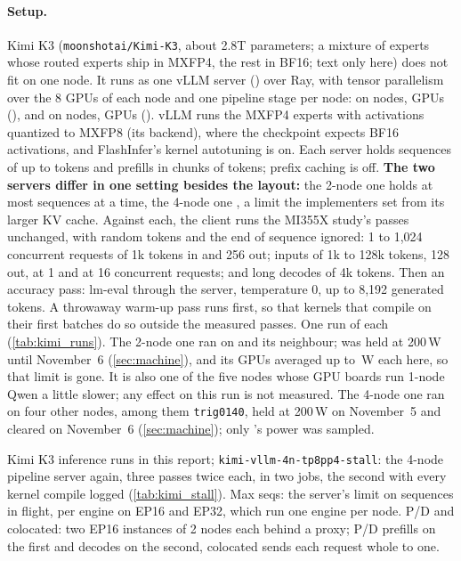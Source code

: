 \paragraph{Setup.} Kimi K3 (\texttt{moonshotai/Kimi-K3}, about 2.8T parameters; a mixture of experts whose routed experts ship in MXFP4, the rest in BF16; text only here) does not fit on one node. It runs as one vLLM server (\TriKimiVllm) over Ray, with tensor parallelism over the 8 GPUs of each node and one pipeline stage per node: on \TriKimiNodes{} nodes, \TriKimiGpus{} GPUs (\TriKimiLayout), and on \TriKimiFourNodes{} nodes, \TriKimiFourGpus{} GPUs (\TriKimiFourLayout). vLLM runs the MXFP4 experts with activations quantized to MXFP8 (its \texttt{\TriKimiMoeBackend} backend), where the checkpoint expects BF16 activations, and FlashInfer's kernel autotuning is on. Each server holds sequences of up to \TriKimiMaxLen{} tokens and prefills in chunks of \TriKimiChunk{} tokens; prefix caching is off. \textbf{The two servers differ in one setting besides the layout:} the 2-node one holds at most \TriKimiMaxSeqs{} sequences at a time, the 4-node one \TriKimiFourMaxSeqs, a limit the implementers set from its larger KV cache. Against each, the client runs the MI355X study's \TriKimiPasses{} passes unchanged, with random tokens and the end of sequence ignored: 1 to 1,024 concurrent requests of 1k tokens in and 256 out; inputs of 1k to 128k tokens, 128 out, at 1 and at 16 concurrent requests; and long decodes of 4k tokens. Then an accuracy pass: lm-eval through the server, temperature 0, up to 8,192 generated tokens. A throwaway warm-up pass runs first, so that kernels that compile on their first batches do so outside the measured passes. One run of each (\cref{tab:kimi_runs}). The 2-node one ran on \texttt{\TriKimiMainHost} and its neighbour; \texttt{\TriKimiMainHost} was held at 200\,W until November~6 (\cref{sec:machine}), and its GPUs averaged up to \TriKimiMainGpuW\,W each here, so that limit is gone. It is also one of the five nodes whose GPU boards run 1-node Qwen a little slower; any effect on this run is not measured. The 4-node one ran on four other nodes, among them \texttt{trig0140}, held at 200\,W on November~5 and cleared on November~6 (\cref{sec:machine}); only \texttt{\TriKimiFourMainHost}'s power was sampled.

\begin{table}[h]
  \caption{Kimi K3 inference runs in this report; \texttt{kimi-vllm-4n-tp8pp4-stall}: the 4-node pipeline server again, three passes twice each, in two jobs, the second with every kernel compile logged (\cref{tab:kimi_stall}). Max seqs: the server's limit on sequences in flight, per engine on EP16 and EP32, which run one engine per node. P/D and colocated: two EP16 instances of 2 nodes each behind a proxy; P/D prefills on the first and decodes on the second, colocated sends each request whole to one.}
  \label{tab:kimi_runs}
  \centering\small
  \begin{adjustbox}{max width=\linewidth}
  \end{adjustbox}
\end{table}

